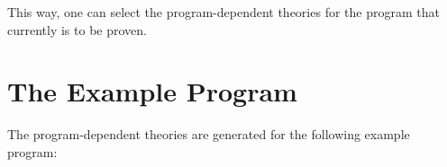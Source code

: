\documentclass[11pt,a4paper,twoside]{article}
\begin{document}
This way, one can select the program-dependent theories for the program that currently is to be proven.

\section{The Example Program} \label{example-program}

The program-dependent theories are generated for the following example program:






\end{document}
